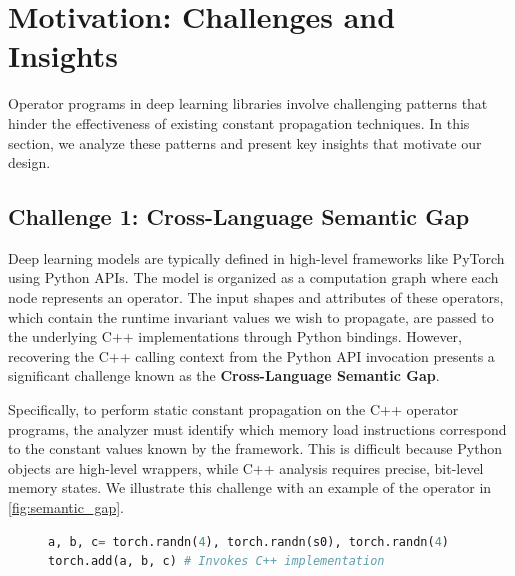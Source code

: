 \section{Motivation: Challenges and Insights}
\label{sec:motivation}

Operator programs in deep learning libraries involve challenging patterns that hinder the effectiveness of existing constant propagation techniques.
In this section, we analyze these patterns and present key insights that motivate our design.

\subsection{Challenge 1: Cross-Language Semantic Gap}
\label{sec:motivation:semantic-gap}

Deep learning models are typically defined in high-level frameworks like PyTorch using Python APIs. The model is organized as a computation graph where each node represents an operator. The input shapes and attributes of these operators, which contain the runtime invariant values we wish to propagate, are passed to the underlying C++ implementations through Python bindings.
However, recovering the C++ calling context from the Python API invocation presents a significant challenge known as the \textbf{Cross-Language Semantic Gap}.

Specifically, to perform static constant propagation on the C++ operator programs, the analyzer must identify which memory load instructions correspond to the constant values known by the framework.
This is difficult because Python objects are high-level wrappers, while C++ analysis requires precise, bit-level memory states.
We illustrate this challenge with an example of the  operator in \autoref{fig:semantic_gap}.

\begin{figure}[htbp]
\centering
\begin{lstlisting}[language=Python, caption={Python API Invocation of the operator \kw{add}}, label={lst:python_view}, frame=tlrb]
a, b, c= torch.randn(4), torch.randn(s0), torch.randn(4)
torch.add(a, b, c) # Invokes C++ implementation
\end{lstlisting}
\end{figure}


